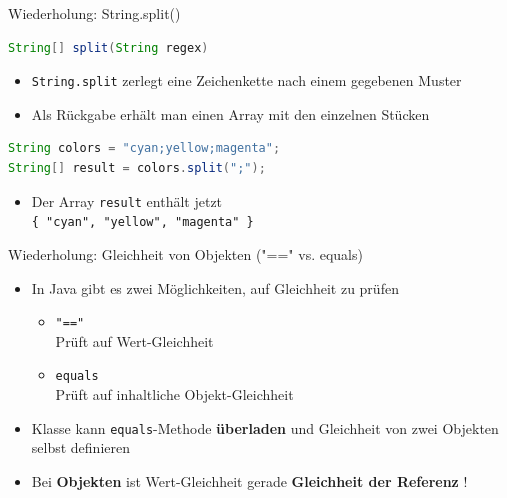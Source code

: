 \documentclass[18pt]{beamer}
\begin{document}
\begin{frame}[fragile]{Wiederholung: String.split()}
    \begin{lstlisting}[language=Java]
String[] split(String regex)
    \end{lstlisting}


    \begin{itemize}
        \item \texttt{String.split} zerlegt eine Zeichenkette nach einem gegebenen Muster
        \item Als Rückgabe erhält man einen Array mit den einzelnen Stücken
    \end{itemize}

\begin{exampleblock}{}
    \begin{lstlisting}[language=Java,basicstyle=\scriptsize]
String colors = "cyan;yellow;magenta";
String[] result = colors.split(";");
    \end{lstlisting}
\end{exampleblock}

\begin{itemize}
    \item Der Array \texttt{result} enthält jetzt\\ \texttt{\{ "cyan", "yellow", "magenta" \}}
\end{itemize}

\end{frame}

\begin{frame}{Wiederholung: Gleichheit von Objekten ("==" vs. equals)}
    \begin{itemize}
        \item In Java gibt es zwei Möglichkeiten, auf Gleichheit zu prüfen
        \begin{itemize}
            \item \texttt{"=="}\\
            Prüft auf Wert-Gleichheit

            \item \texttt{equals}\\
            Prüft auf inhaltliche Objekt-Gleichheit
        \end{itemize}
        \item Klasse kann \texttt{equals}-Methode \textbf{überladen} und Gleichheit von zwei Objekten selbst definieren
        \item \alert{Bei \textbf{Objekten} ist Wert-Gleichheit gerade \textbf{Gleichheit der Referenz} !}
    \end{itemize}
\end{frame}
\end{document}
